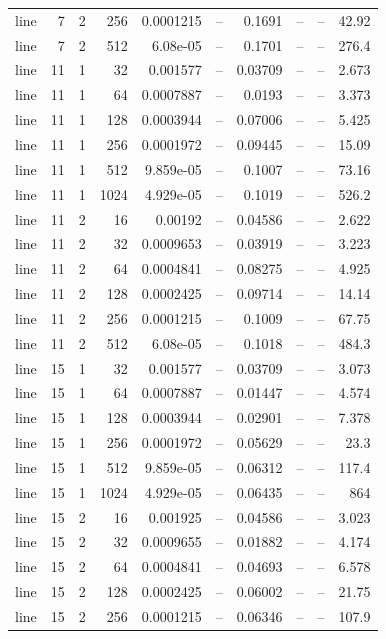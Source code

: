 \begin{tabular}{lrrrrrrrrr}
line & 7 & 2 & 256 & 0.0001215 & -- & 0.1691 & -- & -- & 42.92 \\
line & 7 & 2 & 512 & 6.08e-05 & -- & 0.1701 & -- & -- & 276.4 \\
line & 11 & 1 & 32 & 0.001577 & -- & 0.03709 & -- & -- & 2.673 \\
line & 11 & 1 & 64 & 0.0007887 & -- & 0.0193 & -- & -- & 3.373 \\
line & 11 & 1 & 128 & 0.0003944 & -- & 0.07006 & -- & -- & 5.425 \\
line & 11 & 1 & 256 & 0.0001972 & -- & 0.09445 & -- & -- & 15.09 \\
line & 11 & 1 & 512 & 9.859e-05 & -- & 0.1007 & -- & -- & 73.16 \\
line & 11 & 1 & 1024 & 4.929e-05 & -- & 0.1019 & -- & -- & 526.2 \\
line & 11 & 2 & 16 & 0.00192 & -- & 0.04586 & -- & -- & 2.622 \\
line & 11 & 2 & 32 & 0.0009653 & -- & 0.03919 & -- & -- & 3.223 \\
line & 11 & 2 & 64 & 0.0004841 & -- & 0.08275 & -- & -- & 4.925 \\
line & 11 & 2 & 128 & 0.0002425 & -- & 0.09714 & -- & -- & 14.14 \\
line & 11 & 2 & 256 & 0.0001215 & -- & 0.1009 & -- & -- & 67.75 \\
line & 11 & 2 & 512 & 6.08e-05 & -- & 0.1018 & -- & -- & 484.3 \\
line & 15 & 1 & 32 & 0.001577 & -- & 0.03709 & -- & -- & 3.073 \\
line & 15 & 1 & 64 & 0.0007887 & -- & 0.01447 & -- & -- & 4.574 \\
line & 15 & 1 & 128 & 0.0003944 & -- & 0.02901 & -- & -- & 7.378 \\
line & 15 & 1 & 256 & 0.0001972 & -- & 0.05629 & -- & -- & 23.3 \\
line & 15 & 1 & 512 & 9.859e-05 & -- & 0.06312 & -- & -- & 117.4 \\
line & 15 & 1 & 1024 & 4.929e-05 & -- & 0.06435 & -- & -- & 864 \\
line & 15 & 2 & 16 & 0.001925 & -- & 0.04586 & -- & -- & 3.023 \\
line & 15 & 2 & 32 & 0.0009655 & -- & 0.01882 & -- & -- & 4.174 \\
line & 15 & 2 & 64 & 0.0004841 & -- & 0.04693 & -- & -- & 6.578 \\
line & 15 & 2 & 128 & 0.0002425 & -- & 0.06002 & -- & -- & 21.75 \\
line & 15 & 2 & 256 & 0.0001215 & -- & 0.06346 & -- & -- & 107.9 \\

\end{tabular}
